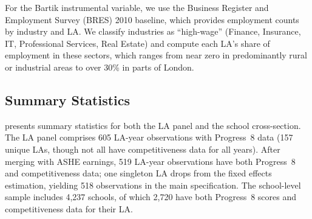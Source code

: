 \documentclass[12pt]{article}
\begin{document}
For the Bartik instrumental variable, we use the Business Register and Employment Survey (BRES) 2010 baseline, which provides employment counts by industry and LA. We classify industries as ``high-wage'' (Finance, Insurance, IT, Professional Services, Real Estate) and compute each LA's share of employment in these sectors, which ranges from near zero in predominantly rural or industrial areas to over 30\% in parts of London.

\subsection{Summary Statistics}

 presents summary statistics for both the LA panel and the school cross-section. The LA panel comprises 605 LA-year observations with Progress~8 data (157 unique LAs, though not all have competitiveness data for all years). After merging with ASHE earnings, 519 LA-year observations have both Progress~8 and competitiveness data; one singleton LA drops from the fixed effects estimation, yielding 518 observations in the main specification. The school-level sample includes 4,237 schools, of which 2,720 have both Progress~8 scores and competitiveness data for their LA.
\end{document}

